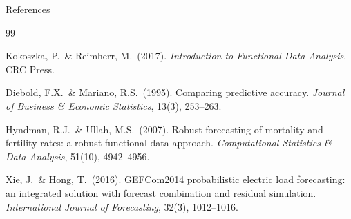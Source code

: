 \documentclass[10pt,aspectratio=169]{beamer}
\begin{document}
\begin{frame}{References}
  \footnotesize
  \begin{thebibliography}{99}

    Kokoszka, P.\ \& Reimherr, M.\ (2017).
    \textit{Introduction to Functional Data Analysis}. CRC Press.

    Diebold, F.X.\ \& Mariano, R.S.\ (1995).
    Comparing predictive accuracy.
    \textit{Journal of Business \& Economic Statistics}, 13(3), 253--263.

    Hyndman, R.J.\ \& Ullah, M.S.\ (2007).
    Robust forecasting of mortality and fertility rates:
    a robust functional data approach.
    \textit{Computational Statistics \& Data Analysis}, 51(10), 4942--4956.

    Xie, J.\ \& Hong, T.\ (2016).
    GEFCom2014 probabilistic electric load forecasting:
    an integrated solution with forecast combination and residual simulation.
    \textit{International Journal of Forecasting}, 32(3), 1012--1016.

  \end{thebibliography}
\end{frame}
\end{document}
